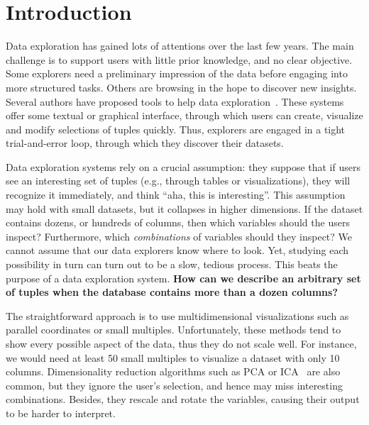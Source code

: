 \section{Introduction}
\label{sec:introdction}
Data exploration has gained lots of attentions over the last few years. The
main challenge is to support users with little prior knowledge, and no clear
objective. Some explorers need a preliminary impression of the data before
engaging into more structured tasks. Others are browsing in the hope to
discover new insights. Several authors have proposed tools to help data
exploration~\cite{abouzied2012dataplay, dimitriadou2014explore,
liarou2014dbtouch, sellam2013meet}. These systems offer some textual or
graphical interface, through which users can create, visualize and modify
selections of tuples quickly. Thus, explorers are engaged in a tight
trial-and-error loop, through which they discover their datasets. 

Data exploration systems rely on a crucial assumption: they suppose that if 
users see an interesting set of tuples (e.g., through tables or
visualizations), they will recognize it immediately, and think ``aha, this is
interesting''. This assumption may hold with small datasets, but it collapses
in higher dimensions. If the dataset contains  dozens, or hundreds of columns,
then which variables should the users inspect? Furthermore, which
\emph{combinations} of variables should they inspect? We cannot assume that
our data explorers know where to look.  Yet, studying each possibility in turn
can turn out to be a slow, tedious process. This beats the purpose of a data
exploration system.
\textbf{How can we describe an arbitrary set of tuples when the
database contains more than a dozen columns?}

The straightforward approach is to use multidimensional visualizations such as
parallel coordinates or small multiples. Unfortunately, these methods tend to
show every possible aspect of the data, thus they do not scale well. For
instance, we would need at least 50 small multiples to visualize a dataset with
only 10 columns. Dimensionality reduction algorithms such as PCA or
ICA~\cite{guyon2003introduction} are also common, but they ignore the user's
selection, and hence may miss interesting combinations.  Besides, they rescale
and rotate the variables, causing their output to be harder to interpret.


